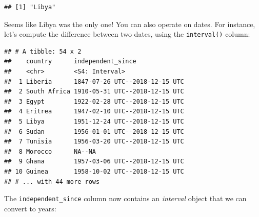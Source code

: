 \documentclass[]{gitbook}
\newenvironment{Shaded}{\begin{snugshade}}{\end{snugshade}}
\newcommand{\DataTypeTok}[1]{\textcolor[rgb]{0.13,0.29,0.53}{#1}}
\newcommand{\KeywordTok}[1]{\textcolor[rgb]{0.13,0.29,0.53}{\textbf{#1}}}
\newcommand{\NormalTok}[1]{#1}
\newcommand{\OperatorTok}[1]{\textcolor[rgb]{0.81,0.36,0.00}{\textbf{#1}}}
\newcommand{\StringTok}[1]{\textcolor[rgb]{0.31,0.60,0.02}{#1}}
\theoremstyle{definition}
\theoremstyle{definition}
\theoremstyle{definition}
\theoremstyle{remark}
\begin{document}
\begin{verbatim}
## [1] "Libya"
\end{verbatim}

Seems like Libya was the only one! You can also operate on dates. For
instance, let's compute the difference between two dates, using the
\texttt{interval()} column:

\begin{Shaded}
\end{Shaded}

\begin{verbatim}
## # A tibble: 54 x 2
##    country      independent_since             
##    <chr>        <S4: Interval>                
##  1 Liberia      1847-07-26 UTC--2018-12-15 UTC
##  2 South Africa 1910-05-31 UTC--2018-12-15 UTC
##  3 Egypt        1922-02-28 UTC--2018-12-15 UTC
##  4 Eritrea      1947-02-10 UTC--2018-12-15 UTC
##  5 Libya        1951-12-24 UTC--2018-12-15 UTC
##  6 Sudan        1956-01-01 UTC--2018-12-15 UTC
##  7 Tunisia      1956-03-20 UTC--2018-12-15 UTC
##  8 Morocco      NA--NA                        
##  9 Ghana        1957-03-06 UTC--2018-12-15 UTC
## 10 Guinea       1958-10-02 UTC--2018-12-15 UTC
## # ... with 44 more rows
\end{verbatim}

The \texttt{independent\_since} column now contains an \emph{interval}
object that we can convert to years:

\begin{Shaded}
\end{Shaded}
\end{document}
